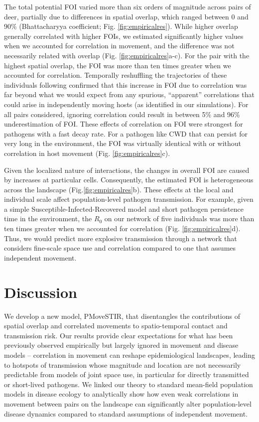 ﻿\documentclass[11pt]{article}
\begin{document}
The total potential FOI varied more than six orders of magnitude across pairs of deer, partially due to differences in spatial overlap, which ranged between 0 and 90\% (Bhattacharyya coefficient; Fig. \ref{fig:empiricalres}). While higher overlap generally correlated with higher FOIs, we estimated significantly higher values when we accounted for correlation in movement, and the difference was not necessarily related with overlap (Fig. \ref{fig:empiricalres}a-c).  For the pair with the highest spatial overlap, the FOI was more than ten times greater when we accounted for correlation. Temporally reshuffling the trajectories of these individuals following \citet{Spiegel2016} confirmed that this increase in FOI due to correlation was far beyond what we would expect from any  spurious, ``apparent'' correlations that could arise in independently moving hosts (as identified in our simulations). For all pairs considered, ignoring correlation could result in between 5\% and 96\% underestimation of FOI. These effects of correlation on FOI were strongest for pathogens with a fast decay rate. For a pathogen like CWD that can persist for very long in the environment, the FOI was virtually identical with or without correlation in host movement (Fig. \ref{fig:empiricalres}c). 

Given the localized nature of interactions, the changes in overall FOI are caused by increases at particular cells. Consequently, the estimated FOI is heterogeneous across the landscape (Fig.\ref{fig:empiricalres}b). These effects at the local and individual scale affect population-level pathogen transmission. For example, given a simple Susceptible-Infected-Recovered model and short pathogen persistence time in the environment, the $R_0$ on our network of five individuals was more than ten times greater when we accounted for correlation (Fig. \ref{fig:empiricalres}d). Thus, we would predict more explosive transmission through a network that considers fine-scale space use and correlation compared to one that assumes independent movement.

\section*{Discussion}

We develop a new model, PMoveSTIR, that disentangles the contributions of spatial overlap and correlated movements to spatio-temporal contact and transmission risk.   Our results provide clear expectations for what has been previously observed empirically but largely ignored in movement and disease models -- correlation in movement can reshape epidemiological landscapes, leading to hotspots of transmission whose magnitude and location are not necessarily predictable from models of joint space use, in particular for directly transmitted or short-lived pathogens.  We linked our theory to standard mean-field population models in disease ecology to analytically show how even weak correlations in movement between pairs on the landscape can significantly alter population-level disease dynamics compared to standard assumptions of independent movement.
\end{document}
